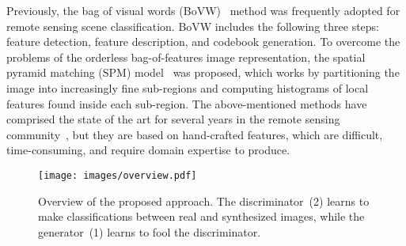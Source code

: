 \documentclass[journal]{IEEEtran}
\begin{document}
Previously, the bag of visual words (BoVW)~\cite{sivic2003video} method was frequently adopted for remote sensing scene classification. BoVW includes the following three steps: feature detection, feature description, and codebook generation. 
To overcome the problems of the orderless bag-of-features image representation, the spatial pyramid matching (SPM) model~\cite{lazebnik2006beyond} was proposed, which works by partitioning the image into increasingly fine sub-regions and computing histograms of local features found inside each sub-region. The above-mentioned methods have comprised the state of the art for several years in the remote sensing community~\cite{lienou2010semantic}, but they are based on hand-crafted features, which are difficult, time-consuming, and require domain expertise to produce.
\begin{figure}[t]
	\begin{center}
		\texttt{[image: images/overview.pdf]}
	\end{center}
	\vspace{-1em}
	\caption{ \label{overview}Overview of the proposed approach. The discriminator~(2) learns to make classifications between real and synthesized images, while the generator~(1) learns to fool the discriminator.
		\vspace{-3mm}
	}
\end{figure}
\end{document}
